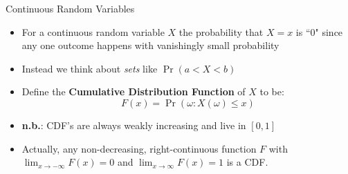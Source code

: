 \begin{frame}{Continuous Random Variables}
\begin{itemize}
	\item For a continuous random variable $X$ the probability that $X=x$ is ``0" since any one outcome happens with vanishingly small probability
	\item Instead we think about \emph{sets} like $\Pr(a<X<b)$
	\item Define the {\bf Cumulative Distribution Function} of $X$ to be:
		\[
			F(x) = \Pr(\omega: X\left(\omega\right) \leq x)
		\]
	\item {\bf n.b.}: CDF's are always weakly increasing and live in $\left[0,1\right]$
	\item Actually, any non-decreasing, right-continuous function $F$ with $\lim_{x\rightarrow-\infty}F\left(x\right)=0$ and $\lim_{x\rightarrow\infty}F\left(x\right)=1$ 
	 	is a CDF.
\end{itemize}
\end{frame}

